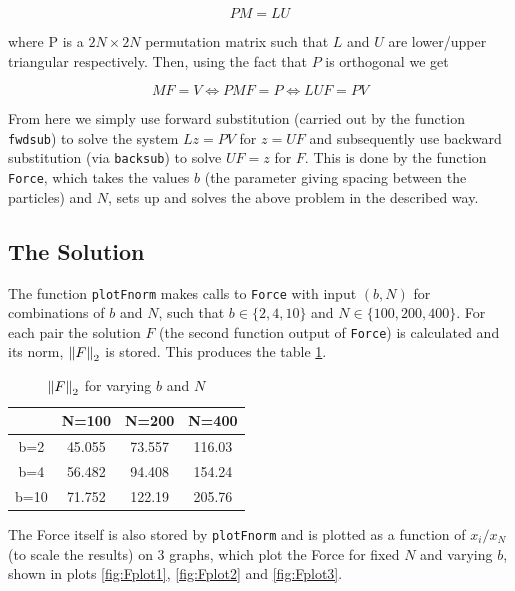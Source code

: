 \documentclass[paper=a4, fontsize=12pt]{scrartcl} %
\numberwithin{equation}{section}       %
\numberwithin{figure}{section}         %
\numberwithin{table}{section}          %
\begin{document}
$$ PM = LU$$ 

\noindent where P is a $2N\times 2N$ permutation matrix such that $L$ and $U$ are lower/upper triangular respectively. Then, using the fact that $P$ is orthogonal we get 

$$ MF = V \iff PMF = P \iff LUF = PV$$

\noindent From here we simply use forward substitution (carried out by the function \texttt{fwdsub}) to solve the system $Lz = PV$ for $z = UF$ and subsequently use backward substitution (via \texttt{backsub}) to solve $UF = z$ for $F$. This is done by the function \texttt{Force}, which takes the values $b$ (the parameter giving spacing between the particles) and $N$, sets up and solves the above problem in the described way. 

\subsection{The Solution}
The function \texttt{plotFnorm} makes calls to \texttt{Force} with input $(b,N)$ for combinations of $b$ and $N$, such that $b\in\{2,4,10\}$ and $N\in\{100,200,400\}$. For each pair the solution $F$ (the second function output of \texttt{Force}) is calculated and its norm, $\norm{F}_2$ is stored. This produces the table \ref{table:1}.

\begin{table}
\begin{center}
  \begin{tabular}{ c||c|c|c }
           & N=100 &    N=200 &    N=400 \\
	\hline 

    b=2  &   45.055  &  73.557&    116.03 \\
    b=4    & 56.482 &   94.408 &   154.24 \\
    b=10  &  71.752  &  122.19   & 205.76
  \end{tabular}
\end{center}
\caption{$\norm{F}_2$ for varying $b$ and $N$}
\label{table:1}
\end{table}

\noindent The Force itself is also stored by \texttt{plotFnorm} and is plotted as a function of $x_i/x_N$ (to scale the results) on 3 graphs, which plot the Force for fixed $N$ and varying $b$, shown in plots \ref{fig:Fplot1}, \ref{fig:Fplot2} and \ref{fig:Fplot3}. 
\end{document}
